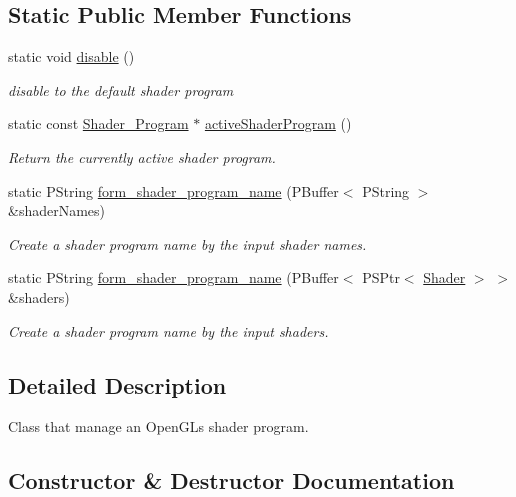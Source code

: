 \subsection*{Static Public Member Functions}
\begin{DoxyCompactItemize}
\item 
static void \mbox{\hyperlink{classprz_1_1_shader___program_ab63e89654d2099c6c7b56f085f3a370f}{disable}} ()
\begin{DoxyCompactList}\small\item\em disable to the default shader program \end{DoxyCompactList}\item 
static const \mbox{\hyperlink{classprz_1_1_shader___program}{Shader\+\_\+\+Program}} $\ast$ \mbox{\hyperlink{classprz_1_1_shader___program_acdfd5708b9913d50047ffafb0fd2fa36}{active\+Shader\+Program}} ()
\begin{DoxyCompactList}\small\item\em Return the currently active shader program. \end{DoxyCompactList}\item 
static P\+String \mbox{\hyperlink{classprz_1_1_shader___program_ade1a6d9e240cfa6e5880bdff8493c5af}{form\+\_\+shader\+\_\+program\+\_\+name}} (P\+Buffer$<$ P\+String $>$ \&shader\+Names)
\begin{DoxyCompactList}\small\item\em Create a shader program name by the input shader names. \end{DoxyCompactList}\item 
static P\+String \mbox{\hyperlink{classprz_1_1_shader___program_ac60371217614e7962a32202f88a62d0e}{form\+\_\+shader\+\_\+program\+\_\+name}} (P\+Buffer$<$ P\+S\+Ptr$<$ \mbox{\hyperlink{classprz_1_1_shader}{Shader}} $>$ $>$ \&shaders)
\begin{DoxyCompactList}\small\item\em Create a shader program name by the input shaders. \end{DoxyCompactList}\end{DoxyCompactItemize}


\subsection{Detailed Description}
Class that manage an Open\+GL\textquotesingle{}s shader program. 



\subsection{Constructor \& Destructor Documentation}
\mbox{\label{classprz_1_1_shader___program_a85eef4afd66769bb35c910b8933a233a}} 
